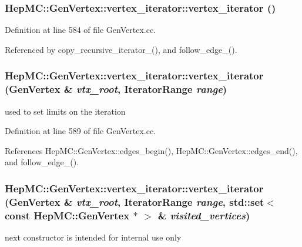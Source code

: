 \subsubsection{\setlength{\rightskip}{0pt plus 5cm}Hep\-MC::Gen\-Vertex::vertex\_\-iterator::vertex\_\-iterator ()}\label{classHepMC_1_1GenVertex_1_1vertex__iterator_8996e798baef5d646eb1012606adc3ad}




Definition at line 584 of file Gen\-Vertex.cc.

Referenced by copy\_\-recursive\_\-iterator\_\-(), and follow\_\-edge\_\-().
\subsubsection{\setlength{\rightskip}{0pt plus 5cm}Hep\-MC::Gen\-Vertex::vertex\_\-iterator::vertex\_\-iterator ({\bf Gen\-Vertex} \& {\em vtx\_\-root}, {\bf Iterator\-Range} {\em range})}\label{classHepMC_1_1GenVertex_1_1vertex__iterator_a2ceed8f61f79796653e47d9e24fece0}


used to set limits on the iteration 



Definition at line 589 of file Gen\-Vertex.cc.

References Hep\-MC::Gen\-Vertex::edges\_\-begin(), Hep\-MC::Gen\-Vertex::edges\_\-end(), and follow\_\-edge\_\-().
\subsubsection{\setlength{\rightskip}{0pt plus 5cm}Hep\-MC::Gen\-Vertex::vertex\_\-iterator::vertex\_\-iterator ({\bf Gen\-Vertex} \& {\em vtx\_\-root}, {\bf Iterator\-Range} {\em range}, std::set$<$ const {\bf Hep\-MC::Gen\-Vertex} $\ast$ $>$ \& {\em visited\_\-vertices})}\label{classHepMC_1_1GenVertex_1_1vertex__iterator_adfe0ec9ba99dac91be7c3728e4c06e5}


next constructor is intended for internal use only 

